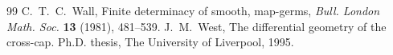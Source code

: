 \documentclass[12pt]{amsart}
\theoremstyle{plain}
\theoremstyle{definition}
\begin{document}
\begin{thebibliography}{99}
{\sc C.~T.~C.~Wall}, 
Finite determinacy of smooth, map-germs, 
\textit{Bull. London Math. Soc.} {\bf 13} (1981), 481--539.
{\sc J.~M.~West},
The differential geometry of the cross-cap.
Ph.D. thesis, The University of Liverpool, 1995.
\end{thebibliography}
\end{document}
